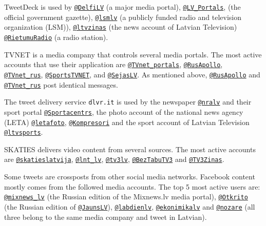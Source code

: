 \documentclass{IOS-Book-Article}
\makeatletter
\newcommand{\sn}[1]{\href{https://twitter.com/#1}{\texttt{@#1}}}
\makeatother
\begin{document}
TweetDeck is used by \sn{DelfiLV} (a major media portal), \sn{LV\_Portals}, (the official government gazette), \sn{lsmlv} (a publicly funded radio and television organization (LSM)), \sn{ltvzinas} (the news account of Latvian Television) \sn{RietumuRadio} (a radio station). 

TVNET is a media company that controls several media portals. The most active accounts that use their application are \sn{TVnet\_portals}, \sn{RusApollo}, \sn{TVnet\_rus}, \sn{SportsTVNET}, and \sn{SejasLV}. As mentioned above, \sn{RusApollo} and \sn{TVnet\_rus} post identical messages.

The tweet delivery service \texttt{dlvr.it} is used by the newspaper \sn{nralv} and their sport portal \sn{Sportacentrs}, the photo account of the national news agency (LETA) \sn{letafoto}, \sn{Kompresori} and the sport account of Latvian Television \sn{ltvsports}.

SKATIES delivers video content from several sources. The most active accounts are \sn{skatieslatvija}, \sn{lnt\_lv}, \sn{tv3lv}, \sn{BezTabuTV3} and \sn{TV3Zinas}.

Some tweets are crossposts from other social media networks. Facebook content mostly comes from the followed media accounts. The top 5 most active users are: \sn{mixnews\_lv} (the Russian edition of the Mixnews.lv media portal), \sn{Otkrito} (the Russian edition of \sn{JaunsLV}), \sn{labdienlv}, \sn{ekonimikalv} and \sn{nozare} (all three belong to the same media company and tweet in Latvian).



\end{document}
